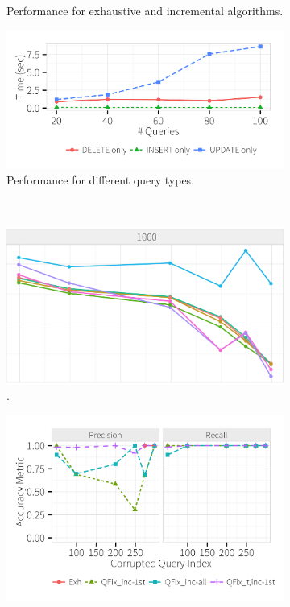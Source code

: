 \begin{figure}[h]
\begin{subfigure}[t]{.3\textwidth}
    \vspace*{-.1in}
    \caption{Performance for exhaustive and incremental algorithms.}
    \label{f:singlequeryinc_time} 
    \end{subfigure}
    \begin{subfigure}[t]{.3\textwidth}
    \includegraphics[width = .99\columnwidth]{figures/indelup_time}
    \vspace*{-.1in}
    \caption{Performance for different query types.}
    \label{f:qtype} 
    \end{subfigure}
    \\
    \begin{subfigure}[t]{.3\textwidth}
    \includegraphics[width = .99\columnwidth]{figures/scale_allalgs}
    \vspace*{-.1in}
    \caption{.}
    \label{f:multiquery} 
    \end{subfigure}
    \begin{subfigure}[t]{.3\textwidth}
    \includegraphics[width = .99\columnwidth]{figures/incrementalcompare_acc}

\end{subfigure}
\end{figure}
